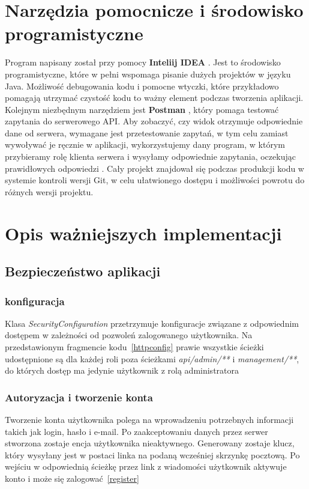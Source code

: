 \section{Narzędzia pomocnicze i środowisko programistyczne }
Program napisany został przy pomocy \textbf{Inteliij IDEA} . Jest to środowisko programistyczne, które w pełni wspomaga pisanie dużych projektów w języku Java. Możliwość debugowania kodu i pomocne wtyczki, które przykładowo pomagają utrzymać czystość kodu to ważny element podczas tworzenia aplikacji.
Kolejnym niezbędnym narzędziem jest \textbf{Postman }, który pomaga testować zapytania do serwerowego API. Aby zobaczyć, czy widok otrzymuje odpowiednie dane od serwera, wymagane jest przetestowanie zapytań, w tym celu zamiast wywoływać je ręcznie w aplikacji, wykorzystujemy dany program, w którym przybieramy rolę klienta serwera i wysyłamy odpowiednie zapytania, oczekując prawidłowych odpowiedzi \cite{Postman}.
Cały projekt znajdował się podczas produkcji kodu w systemie kontroli wersji Git, w celu ułatwionego dostępu i możliwości powrotu do różnych wersji projektu\cite{git}.


\section{Opis ważniejszych  implementacji}

\subsection{Bezpieczeństwo aplikacji}
\subsubsection{konfiguracja}
Klasa \textit{SecurityConfiguration} przetrzymuje konfiguracje związane z odpowiednim dostępem w zależności od pozwoleń zalogowanego użytkownika. Na przedstawionym fragmencie kodu~\ref{httpconfig} prawie wszystkie ścieżki udostępnione są dla każdej roli poza ścieżkami \textit{api/admin/**} i \textit{management/**}, do których dostęp ma jedynie użytkownik z rolą administratora

\subsubsection{Autoryzacja i tworzenie konta}
Tworzenie konta użytkownika polega na wprowadzeniu potrzebnych informacji takich jak login, hasło i e-mail. Po zaakceptowaniu danych przez serwer stworzona zostaje encja użytkownika nieaktywnego. Generowany zostaje klucz, który wysyłany jest w postaci linka na podaną wcześniej skrzynkę pocztową. Po wejściu w odpowiednią ścieżkę przez link z wiadomości użytkownik aktywuje konto i może się zalogować~\ref{register}

